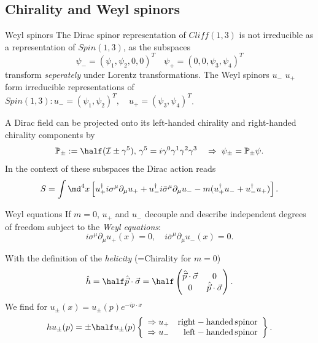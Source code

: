 \subsection{Chirality and Weyl spinors}
\begin{mybox}{Weyl spinors}
	The Dirac spinor representation  of $Cliff(1,3)$ is not irreducible as a representation of $Spin(1,3)$, as the subspaces 
\begin{equation}
	\psi_- = (\psi_1,\psi_2,0,0)^T \quad \psi_+ = (0,0,\psi_3,\psi_4)^T
\end{equation}
transform \emph{seperately} under Lorentz transformations. The Weyl spinors $u_-$ $u_+$ form irreducible representations of $Spin(1,3): u_-=(\psi_1,\psi_2)^T, \quad u_+=(\psi_3,\psi_4)^T$.\\
\end{mybox}
A Dirac field can be projected onto its left-handed chirality and right-handed chirality components by
\begin{equation}
	\mathbb{P}_{\pm} := \half (\mathcal{I}\pm \gamma^5), \, \gamma^5 = i \gamma^0 \gamma^1 \gamma^2 \gamma^3 \quad\Rightarrow \; \psi_{\pm} = \mathbb{P}_{\pm} \psi.
\end{equation}
In the context of these subspaces the Dirac action reads
\begin{equation}
	S = \int \md^4 x \left[u^{\dagger}_+ i \sigma^{\mu} \partial_{\mu} u_+ + u^{\dagger}_- i \bar{\sigma}^{\mu} \partial_{\mu} u_- -m(u^{\dagger}_+ u_-+ u^{\dagger}_- u_+) \right].
\end{equation}
\begin{mybox}{Weyl equations}
	If $m=0$, $u_+$ and $u_-$ decouple and describe independent degrees of freedom subject to the \emph{Weyl equations}:
	\begin{equation}
		i \sigma^{\mu} \partial_{\mu} u_+ (x) = 0, \quad i\bar{\sigma}^{\mu} \partial_{\mu} u_-(x)=0.
	\end{equation}
\end{mybox}
With the definition of the \emph{helicity} (=Chirality for $m=0$) 
\begin{equation}
	\hat{h} = \half \hat{\vec{p}} \cdot \vec{\sigma} = \half \begin{pmatrix}
	\hat{\vec{p}} \cdot \vec{\sigma } &0 \\
	0 & \hat{\vec{p}} \cdot \vec{\sigma}
	\end{pmatrix}.
\end{equation}
We find for $u_{\pm}(x) = u_{\pm}(p) e^{-i p\cdot x}$ 
\begin{equation}
	h u_{\pm} (p) = \pm \half u_{\pm} (p) \left\{	\begin{array}{lr}
	\Rightarrow u_+ & \mathrm{right-handed \, spinor} \\
	\Rightarrow u_- & \mathrm{left-handed \, spinor}
	\end{array}			\right\}.
\end{equation}




